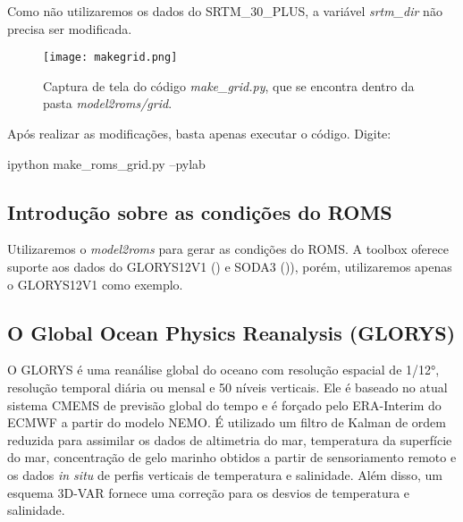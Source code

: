 \begin{tcolorbox}[enhanced,
    grow to left by   = 0cm,
    grow to right by  = 0cm,
    enlarge top by    = 0cm,
    enlarge bottom by = 0cm,
    tcbox raise base,
    boxrule           = 1.0pt,
    left              = 18mm,
    colframe          = red!50!black,coltext=red!25!black,colback=red!10!white,
    overlay           = {\begin{tcbclipinterior}\fill[red!75!blue!50!white] (frame.south west)
      rectangle node[text=white,font=\sffamily\bfseries\footnotesize,rotate=0] {ATENÇÃO} ([xshift=18mm]frame.north west);\end{tcbclipinterior}}]
  Como não utilizaremos os dados do SRTM\_30\_PLUS, a variável \textit{srtm\_dir} não precisa ser modificada.
\end{tcolorbox}
\bigskip

\begin{figure}[H]
    \centering
    \texttt{[image: makegrid.png]}
    \caption{Captura de tela do código \textit{make\_grid.py}, que se encontra dentro da pasta \textit{model2roms/grid}.}
    \label{fazgrade}
\end{figure}
\bigskip

\noindent Após realizar as modificações, basta apenas executar o código. Digite:
\bigskip

\begin{bashcode}
ipython make_roms_grid.py --pylab
\end{bashcode}
\bigskip

\subsection{Introdução sobre as condições do ROMS}
\bigskip

\noindent Utilizaremos o \textit{model2roms} para gerar as condições do ROMS. A toolbox oferece suporte aos dados do GLORYS12V1 (\cite{Fernandez2018}) e SODA3 ()\cite{Carton2018}), porém, utilizaremos apenas o GLORYS12V1 como exemplo.

\subsection{O Global Ocean Physics Reanalysis (GLORYS)}
\bigskip

\noindent  O GLORYS é uma reanálise global do oceano com resolução espacial de 1/12°, resolução temporal diária ou mensal e 50 níveis verticais. Ele é baseado no atual sistema CMEMS de previsão global do tempo e é forçado pelo ERA-Interim do ECMWF a partir do modelo NEMO. É utilizado um filtro de Kalman de ordem reduzida para assimilar os dados de altimetria do mar, temperatura da superfície do mar, concentração de gelo marinho obtidos a partir de sensoriamento remoto e os dados \textit{in situ} de perfis verticais de temperatura e salinidade. Além disso, um esquema 3D-VAR fornece uma correção para os desvios de temperatura e salinidade. 
\bigskip

